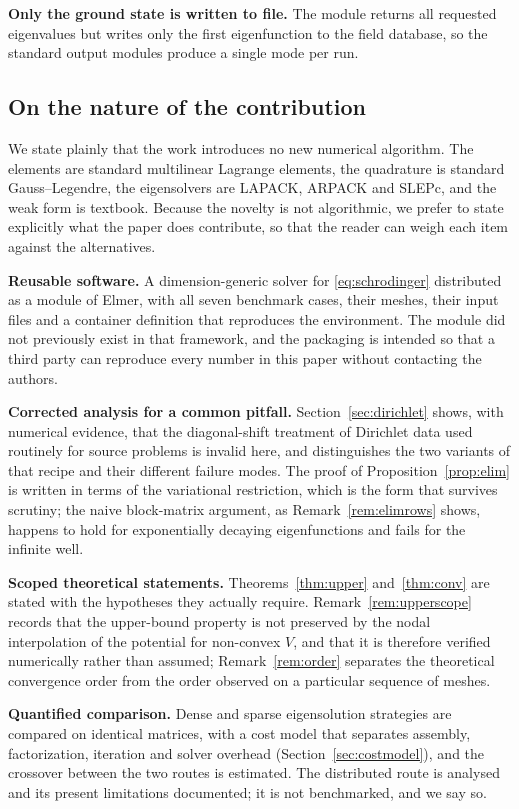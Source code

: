 \documentclass[pdflatex,sn-mathphys-num]{sn-jnl}
\theoremstyle{thmstyleone}%
\theoremstyle{thmstyletwo}%
\theoremstyle{thmstylethree}%
\begin{document}
\textbf{Only the ground state is written to file.} The module returns all
requested eigenvalues but writes only the first eigenfunction to the field
database, so the standard output modules produce a single mode per run.

\subsection{On the nature of the contribution}

We state plainly that the work introduces no new numerical algorithm. The
elements are standard multilinear Lagrange elements, the quadrature is standard
Gauss--Legendre, the eigensolvers are LAPACK, ARPACK and SLEPc, and the weak
form is textbook. Because the novelty is not algorithmic, we prefer to state
explicitly what the paper does contribute, so that the reader can weigh each
item against the alternatives.

\textbf{Reusable software.} A dimension-generic solver for
\eqref{eq:schrodinger} distributed as a module of \textsf{Elmer}, with all seven
benchmark cases, their meshes, their input files and a container definition that
reproduces the environment. The module did not previously exist in that
framework, and the packaging is intended so that a third party can reproduce
every number in this paper without contacting the authors.

\textbf{Corrected analysis for a common pitfall.} Section~\ref{sec:dirichlet}
shows, with numerical evidence, that the diagonal-shift treatment of Dirichlet
data used routinely for source problems is invalid here, and distinguishes the
two variants of that recipe and their different failure modes. The proof of
Proposition~\ref{prop:elim} is written in terms of the variational restriction,
which is the form that survives scrutiny; the naive block-matrix argument, as
Remark~\ref{rem:elimrows} shows, happens to hold for exponentially decaying
eigenfunctions and fails for the infinite well.

\textbf{Scoped theoretical statements.} Theorems~\ref{thm:upper}
and~\ref{thm:conv} are stated with the hypotheses they actually require.
Remark~\ref{rem:upperscope} records that the upper-bound property is not
preserved by the nodal interpolation of the potential for non-convex $V$, and
that it is therefore verified numerically rather than assumed;
Remark~\ref{rem:order} separates the theoretical convergence order from the
order observed on a particular sequence of meshes.

\textbf{Quantified comparison.} Dense and sparse eigensolution strategies are
compared on identical matrices, with a cost model that separates assembly,
factorization, iteration and solver overhead
(Section~\ref{sec:costmodel}), and the crossover between the two routes is
estimated. The distributed route is analysed and its present limitations
documented; it is not benchmarked, and we say so.
\end{document}
